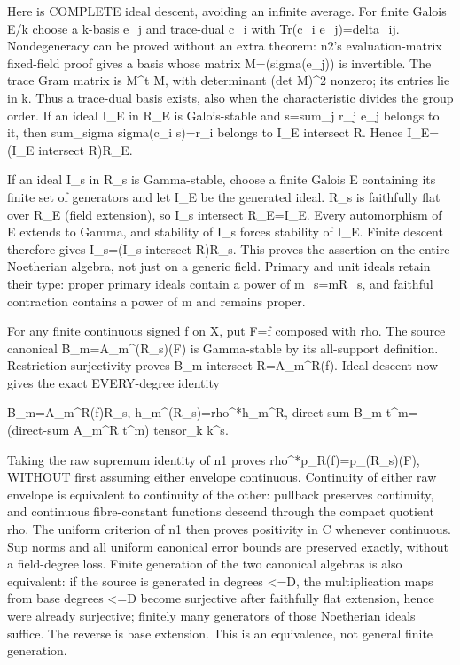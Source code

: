 Here is COMPLETE ideal descent, avoiding an infinite average. For finite Galois E/k choose a k-basis e\_j and trace-dual c\_i with Tr(c\_i e\_j)=delta\_ij. Nondegeneracy can be proved without an extra theorem: n2's evaluation-matrix fixed-field proof gives a basis whose matrix M=(sigma(e\_j)) is invertible. The trace Gram matrix is M\textasciicircum{}t M, with determinant (det M)\textasciicircum{}2 nonzero; its entries lie in k. Thus a trace-dual basis exists, also when the characteristic divides the group order. If an ideal I\_E in R\_E is Galois-stable and s=sum\_j r\_j e\_j belongs to it, then sum\_sigma sigma(c\_i s)=r\_i belongs to I\_E intersect R. Hence I\_E=(I\_E intersect R)R\_E.

If an ideal I\_s in R\_s is Gamma-stable, choose a finite Galois E containing its finite set of generators and let I\_E be the generated ideal. R\_s is faithfully flat over R\_E (field extension), so I\_s intersect R\_E=I\_E. Every automorphism of E extends to Gamma, and stability of I\_s forces stability of I\_E. Finite descent therefore gives I\_s=(I\_s intersect R)R\_s. This proves the assertion on the entire Noetherian algebra, not just on a generic field. Primary and unit ideals retain their type: proper primary ideals contain a power of m\_s=mR\_s, and faithful contraction contains a power of m and remains proper.

For any finite continuous signed f on X, put F=f composed with rho. The source canonical B\_m=A\_m\textasciicircum{}(R\_s)(F) is Gamma-stable by its all-support definition. Restriction surjectivity proves B\_m intersect R=A\_m\textasciicircum{}R(f). Ideal descent now gives the exact EVERY-degree identity

 B\_m=A\_m\textasciicircum{}R(f)R\_s,  h\_m\textasciicircum{}(R\_s)=rho\textasciicircum{}*h\_m\textasciicircum{}R,
 direct-sum B\_m t\textasciicircum{}m=(direct-sum A\_m\textasciicircum{}R t\textasciicircum{}m) tensor\_k k\textasciicircum{}s.

Taking the raw supremum identity of n1 proves rho\textasciicircum{}*p\_R(f)=p\_(R\_s)(F), WITHOUT first assuming either envelope continuous. Continuity of either raw envelope is equivalent to continuity of the other: pullback preserves continuity, and continuous fibre-constant functions descend through the compact quotient rho. The uniform criterion of n1 then proves positivity in C whenever continuous. Sup norms and all uniform canonical error bounds are preserved exactly, without a field-degree loss. Finite generation of the two canonical algebras is also equivalent: if the source is generated in degrees \textless{}=D, the multiplication maps from base degrees \textless{}=D become surjective after faithfully flat extension, hence were already surjective; finitely many generators of those Noetherian ideals suffice. The reverse is base extension. This is an equivalence, not general finite generation.

